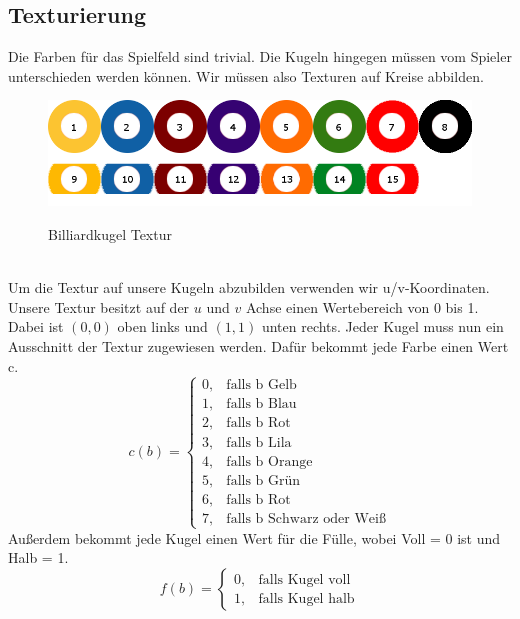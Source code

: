 \subsection{Texturierung}
	Die Farben für das Spielfeld sind trivial. 
	Die Kugeln hingegen müssen vom Spieler unterschieden werden können. 
	Wir müssen also Texturen auf Kreise abbilden. \\
	\begin{figure}[h]
		\caption{Billiardkugel Textur}
			\includegraphics[width=\textwidth]{bilder/Balls.png} \\
	\end{figure} \\
	Um die Textur auf unsere Kugeln abzubilden verwenden wir u/v-Koordinaten. 
	Unsere Textur besitzt auf der $u$ und $v$ Achse einen Wertebereich von 0 bis 1. 
	Dabei ist $(0,0)$  oben links und $(1,1)$  unten rechts. 
	Jeder Kugel muss nun ein Ausschnitt der Textur zugewiesen werden. 
	Dafür bekommt jede Farbe einen Wert c.
	\begin{equation}\label{eq:color}
	c(b) = 
	\begin{cases}
		0, & \text{falls b Gelb} \\
		1, & \text{falls b Blau} \\
		2, & \text{falls b Rot} \\
		3, & \text{falls b Lila} \\
		4, & \text{falls b Orange} \\
		5, & \text{falls b Grün} \\
		6, & \text{falls b Rot} \\
		7, & \text{falls b Schwarz oder Weiß}
	\end{cases}
	\end{equation} 
	Außerdem bekommt jede Kugel einen Wert für die Fülle, wobei Voll = 0 ist und Halb = 1.  \\
	\begin{equation} \label{eq:full}
	f(b) = 
	\begin{cases}
		0, & \text{falls Kugel voll} \\
		1, & \text{falls Kugel halb}	
	\end{cases}
	\end{equation}\\
